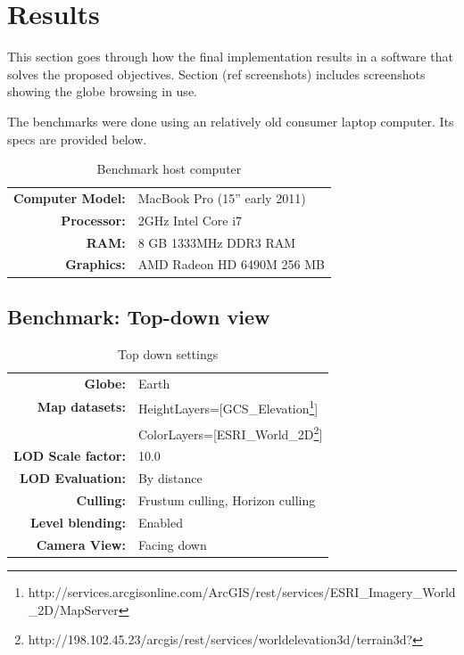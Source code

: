 \chapter{Results}
This section goes through how the final implementation results in a software that solves the proposed objectives. Section (ref screenshots) includes screenshots showing the globe browsing in use.

The benchmarks were done using an relatively old consumer laptop computer. Its specs are provided below.

\begin{table}[h]
  \centering
  \caption[]{Benchmark host computer}
    \label{table:benchmark host}
  \begin{tabular}{| r l |}
    \hline
      \textbf{Computer Model:}  & MacBook Pro (15'' early 2011) \\
      \textbf{Processor:}       & 2GHz Intel Core i7 \\
      \textbf{RAM:}             & 8 GB 1333MHz DDR3 RAM \\
      \textbf{Graphics:}        & AMD Radeon HD 6490M 256 MB \\
    \hline
  \end{tabular}
\end{table}

\clearpage
\section{Benchmark: Top-down view}
\FloatBarrier
\begin{table}[h]
  \centering
  \caption[]{Top down settings}
    \label{table:settingstopdown}
  \begin{tabular}{| r l |}
    \hline
      \textbf{Globe:}             & Earth \\
      \textbf{Map datasets:}      & HeightLayers=[GCS\_Elevation\footnote{http://services.arcgisonline.com/ArcGIS/rest/services/ESRI\_Imagery\_World\_2D/MapServer}] \\
                                  & ColorLayers=[ESRI\_World\_2D\footnote{http://198.102.45.23/arcgis/rest/services/worldelevation3d/terrain3d?}] \\
      \textbf{LOD Scale factor:}  & 10.0 \\
      \textbf{LOD Evaluation:}    & By distance \\
      \textbf{Culling:}           & Frustum culling, Horizon culling \\
      \textbf{Level blending:}    & Enabled \\
      \textbf{Camera View:}       & Facing down \\
    \hline
  \end{tabular}
\end{table}


